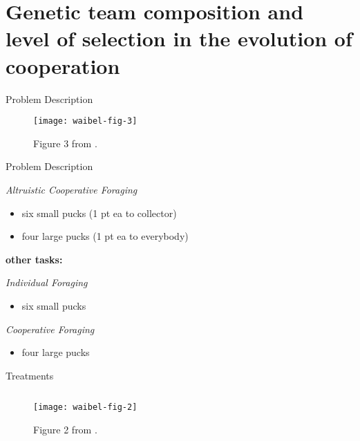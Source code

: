 \section{Genetic team composition and level of selection in the evolution of cooperation \cite{waibel2009genetic}}

\begin{frame}{Problem Description}

\begin{figure}
\texttt{[image: waibel-fig-3]}
\vspace{1ex}
\caption{
Figure 3 from \cite{waibel2009genetic}.
}
\end{figure}

\end{frame}

\begin{frame}{Problem Description}

\textit{Altruistic Cooperative Foraging}
\begin{itemize}
\item six small pucks (1 pt ea to collector)
\item four large pucks (1 pt ea to everybody)
\end{itemize}

\textbf{other tasks:}

\textit{Individual Foraging}
\begin{itemize}
\item six small pucks
\end{itemize}

\textit{Cooperative Foraging}
\begin{itemize}
\item four large pucks
\end{itemize}

\end{frame}


\begin{frame}{Treatments}

\begin{figure}
\begin{columns}
\begin{column}{0.7\textwidth}
\texttt{[image: waibel-fig-2]}
\end{column}
\begin{column}{0.3\textwidth}
\caption{
Figure 2 from \cite{waibel2009genetic}.
}
\end{column}
\end{columns}
\end{figure}

\end{frame}

